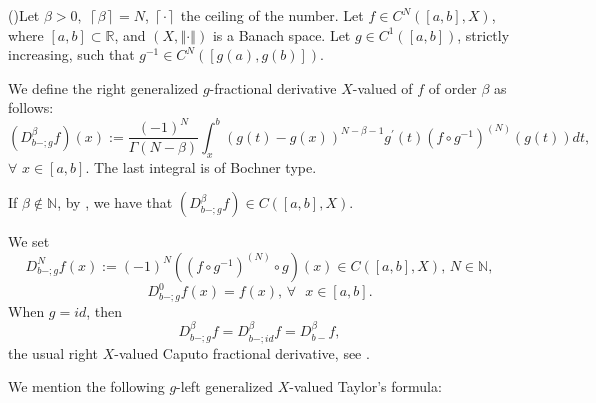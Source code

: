 \documentclass[10pt]{NSP1}
\numberwithin{equation}{section}
\begin{document}
\begin{definition}
\label{d5}(\cite{5})Let $\beta >0,$ $\left \lceil \beta \right \rceil =N$, $%
\left \lceil \cdot \right \rceil $ the ceiling of the number. Let $f\in
C^{N}\left( \left[ a,b\right] ,X\right) $, where $\left[ a,b\right] \subset
\mathbb{R}$, and $\left( X,\left \Vert \cdot \right \Vert \right) $ is a
Banach space. Let $g\in C^{1}\left( \left[ a,b\right] \right) $, strictly
increasing, such that $g^{-1}\in C^{N}\left( \left[ g\left( a\right)
,g\left( b\right) \right] \right) .$

We define the right generalized $g$-fractional derivative $X$-valued of $f$
of order $\beta $ as follows:
\begin{equation}
\left( D_{b-;g}^{\beta }f\right) \left( x\right) :=\frac{\left( -1\right)
^{N}}{\Gamma \left( N-\beta \right) }\int_{x}^{b}\left( g\left( t\right)
-g\left( x\right) \right) ^{N-\beta -1}g^{\prime }\left( t\right) \left(
f\circ g^{-1}\right) ^{\left( N\right) }\left( g\left( t\right) \right) dt,
\tag{18}  \label{18}
\end{equation}
$\forall $ $x\in \left[ a,b\right] $. The last integral is of Bochner type.

If $\beta \notin \mathbb{N}$, by \cite{5}, we have that $\left(
D_{b-;g}^{\beta }f\right) \in C\left( \left[ a,b\right] ,X\right) .$
\end{definition}

We set
\begin{equation}
D_{b-;g}^{N}f\left( x\right) :=\left( -1\right) ^{N}\left( \left( f\circ
g^{-1}\right) ^{\left( N\right) }\circ g\right) \left( x\right) \in C\left(
\left[ a,b\right] ,X\right) \text{, \ }N\in \mathbb{N},  \tag{19}  \label{19}
\end{equation}
\begin{equation*}
D_{b-;g}^{0}f\left( x\right) =f\left( x\right) \text{, \ }\forall \text{ }%
x\in \left[ a,b\right] .
\end{equation*}
When $g=id$, then
\begin{equation}
D_{b-;g}^{\beta }f=D_{b-;id}^{\beta }f=D_{b-}^{\beta }f,  \tag{20}
\label{20}
\end{equation}
the usual right $X$-valued Caputo fractional derivative, see \cite{3,10,11}.

We mention the following $g$-left generalized $X$-valued Taylor's formula:
\end{document}
